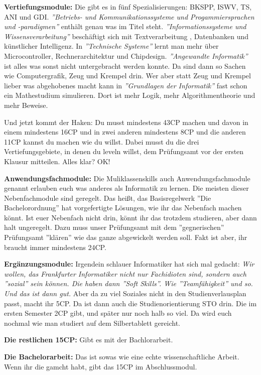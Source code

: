 \textbf{Vertiefungsmodule:}
Die gibt es in f\"unf Spezialisierungen: BKSPP, ISWV, TS, ANI und GDI. \emph{''Betriebs-
und Kommunikationssysteme und Progammiersprachen und -paradigmen''} enth\"alt
genau was im Titel steht. \emph{''Informationssysteme und Wissensverarbeitung''}
besch\"aftigt sich mit Textverarbeitung , Datenbanken und k\"unstlicher
Intelligenz. In \emph{''Technische Systeme''} lernt man mehr \"uber Microcontroller,
Rechnerarchitektur und Chipdesign. \emph{''Angewandte Informatik''} ist alles was
sonst nicht untergebracht werden konnte. Da sind dann so Sachen wie
Computergrafik, Zeug und Krempel drin. Wer aber statt Zeug und Krempel lieber
was abgehobenes macht kann in \emph{''Grundlagen der Informatik''} fast schon ein
Mathestudium simulieren. Dort ist mehr Logik, mehr Algorithmentheorie und mehr
Beweise.

Und jetzt kommt der Haken: Du musst mindestens 43CP machen und davon in einem
mindestens 16CP und in zwei anderen mindestens 8CP und die anderen 11CP kannst
du machen wie du willst. Dabei musst du die drei Vertiefungsgebiete, in denen
du leveln willst, dem Pr\"ufungsamt vor der ersten Klausur mitteilen. Alles
klar? OK!

\textbf{Anwendungsfachmodule:}
Die Muliklassenskills auch Anwendungsfachmodule genannt erlauben euch was anderes als Informatik zu lernen.
Die meisten dieser Nebenfachmodule sind geregelt. Das hei{\ss}t, das
Basisregelwerk ''Die Bachelorordnung'' hat vorgefertigte L\"osungen, wie ihr das
Nebenfach machen k\"onnt. Ist euer Nebenfach nicht drin, k\"onnt ihr das trotzdem studieren, aber dann halt ungeregelt.
Dazu muss unser Pr\"ufungsamt mit dem ''gegnerischen'' Pr\"ufungsamt ''kl\"aren'' wie das ganze abgewickelt werden soll.
Fakt ist aber, ihr braucht immer mindestens 24CP.

\textbf{Erg\"anzungsmodule:}
Irgendein schlauer Informatiker hat sich mal gedacht: \emph{Wir wollen, das
Frankfurter Informatiker nicht nur Fachidioten sind, sondern auch ''sozial''
sein k\"onnen. Die haben dann ''Soft Skills''. Wie ''Teamf\"ahigkeit'' und so. Und das
ist dann gut.} Aber da zu viel Soziales nicht in den Studienverlausplan passt, macht ihr 5CP.
Da ist dann auch die Studienorientierung STO drin. Die im ersten Semester 2CP gibt, und sp\"ater nur noch halb so viel.
Da wird euch nochmal wie man studiert auf dem Silbertablett gereicht.

\textbf{Die restlichen 15CP:}
Gibt es mit der Bachlorarbeit.

\textbf{Die Bachelorarbeit:}
Das ist sowas wie eine echte wissenschaftliche Arbeit. Wenn ihr die gamcht habt, gibt das 15CP im Abschlussmodul.

